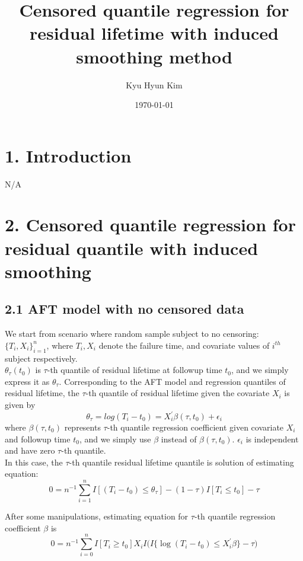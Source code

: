\documentclass[12pt]{article}
\title{Censored quantile regression for residual lifetime with induced smoothing method}
\author{Kyu Hyun Kim}
\date{\today}
\begin{document}
	\maketitle
\section{1. Introduction}
	N/A
\section{2. Censored quantile regression for residual quantile with induced smoothing}
\subsection{2.1 AFT model with no censored data}
	We start from scenario where random sample subject to no censoring: $\{T_i, X_i\}_{i=1}^{n}$, where $T_i, X_i$ denote the failure time, and covariate values of $i^{th}$ subject respectively.\\
		
	\noindent $\theta_{\tau}(t_0)$ is $\tau$-th quantile of residual lifetime at followup time $t_0$, and we simply express it as $\theta_{\tau}$. Corresponding to the AFT model and regression quantiles of residual lifetime, the $\tau$-th quantile of residual lifetime given the covariate $X_i$ is given by
	\begin{equation} \label{eq:1}
	\theta_{\tau}=log(T_i-t_0)=X_{i}^{\prime}\beta(\tau, t_0)+\epsilon_i
	\end{equation}
	where $\beta(\tau, t_0)$ represents $\tau$-th quantile regression coefficient given covariate $X_i$ and followup time $t_0$, and we simply use $\beta$ instead of $\beta(\tau, t_0)$. $\epsilon_i$ is independent and have zero $\tau$-th quantile.\\
	
	\noindent In this case, the $\tau$-th quantile residual lifetime quantile is solution of estimating equation:
	\begin{equation} \label{eq:2}
	0 = n^{-1}\sum_{i=1}^{n}I[(T_i-t_0)\leq\theta_{\tau}]-(1-\tau)I[T_i \leq t_0]-\tau
	\end{equation}

	\noindent After some manipulations, estimating equation for $\tau$-th quantile regression coefficient $\beta$ is
	\begin{equation} \label{eq:3}
	0 = n^{-1}\sum_{i=0}^{n}I[T_i \ge t_0] X_i I \Big(I\{\log(T_i - t_0) \leq X_i^{\prime}\beta\} - \tau \Big)
	\end{equation}
\end{document}
